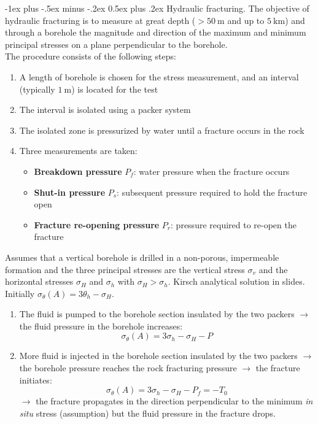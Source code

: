 \documentclass[10pt,landscape,a4paper]{article}
\makeatletter
\renewcommand{\section}{\@startsection{section}{1}{0mm}%
	{-1ex plus -.5ex minus -.2ex}%
	{0.5ex plus .2ex}%
	{\normalfont\large\bfseries}}
\makeatother
\begin{document}
\begin{multicols}{3}
		\section{Hydraulic fracturing.}
		The objective of hydraulic fracturing is to measure at great depth ($>50\SI{}{\meter}$ and up to $\SI{5}{\kilo\meter}$) and through a borehole the magnitude and direction of the maximum and minimum principal stresses on a plane perpendicular to the borehole.\\
		The procedure consists of the following steps:
		\begin{enumerate}
			\item A length of borehole is chosen for the stress measurement, and an interval (typically $\SI{1}{\meter}$) is located for the test
			\item The interval is isolated using a packer system
			\item The isolated zone is pressurized by water until a fracture occurs in the rock
			\item Three measurements are taken:
			\begin{itemize}
				\item \textbf{Breakdown pressure} $P_f$: water pressure when the fracture occurs
				\item \textbf{Shut-in pressure} $P_s$: subsequent pressure required to hold the fracture open
				\item \textbf{Fracture re-opening pressure} $P_r$: pressure required to re-open the fracture
			\end{itemize}
		\end{enumerate}
		Assumes that a vertical borehole is drilled in a non-porous, impermeable formation and the three principal stresses are the vertical stress $\sigma_v$ and the horizontal stresses $\sigma_H$ and $\sigma_h$ with $\sigma_H>\sigma_h$.
		Kirsch analytical solution in slides.
		Initially $\sigma_\theta(A)=3\theta_h-\sigma_H$.
		\begin{enumerate}
			\item The fluid is pumped to the borehole section insulated by the two packers $\to$ the fluid pressure in the borehole increases:
			\[
				\sigma_\theta(A)=3\sigma_h-\sigma_H-P
			\]
			\item More fluid is injected in the borehole section insulated by the two packers $\to$ the borehole pressure reaches the rock fracturing pressure $\to$ the fracture initiates:
			\[
				\sigma_\theta(A)=3\sigma_h-\sigma_H-P_f=-T_0
			\]
			$\to$ the fracture propagates in the direction perpendicular to the minimum \textit{in situ} stress (assumption) but the fluid pressure in the fracture drops.

\end{enumerate}
\end{multicols}
\end{document}
